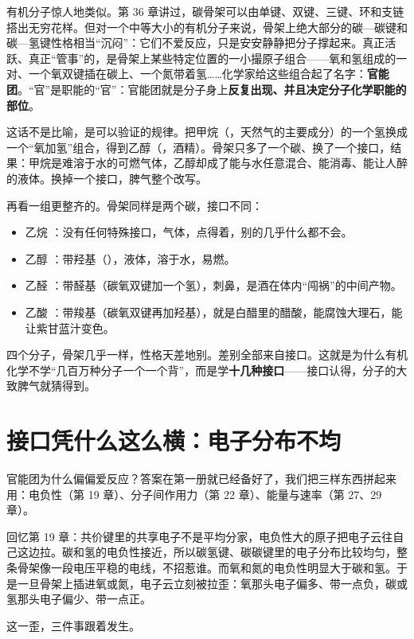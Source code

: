 有机分子惊人地类似。第 36 章讲过，碳骨架可以由单键、双键、三键、环和支链搭出无穷花样。但对一个中等大小的有机分子来说，骨架上绝大部分的碳—碳键和碳—氢键性格相当“沉闷”：它们不爱反应，只是安安静静把分子撑起来。真正活跃、真正“管事”的，是骨架上某些特定位置的一小撮原子组合——氧和氢组成的一对、一个氧双键插在碳上、一个氮带着氢……化学家给这些组合起了名字：\textbf{官能团}。“官”是职能的“官”：官能团就是分子身上\textbf{反复出现、并且决定分子化学职能的部位}。

这话不是比喻，是可以验证的规律。把甲烷（，天然气的主要成分）的一个氢换成一个“氧加氢”组合，得到乙醇（，酒精）。骨架只多了一个碳、换了一个接口，结果：甲烷是难溶于水的可燃气体，乙醇却成了能与水任意混合、能消毒、能让人醉的液体。换掉一个接口，脾气整个改写。

再看一组更整齐的。骨架同样是两个碳，接口不同：

\begin{itemize}[itemsep=2pt]
\item 乙烷 ：没有任何特殊接口，气体，点得着，别的几乎什么都不会。
\item 乙醇 ：带羟基（），液体，溶于水，易燃。
\item 乙醛 ：带醛基（碳氧双键加一个氢），刺鼻，是酒在体内“闯祸”的中间产物。
\item 乙酸 ：带羧基（碳氧双键再加羟基），就是白醋里的醋酸，能腐蚀大理石，能让紫甘蓝汁变色。
\end{itemize}

四个分子，骨架几乎一样，性格天差地别。差别全部来自接口。这就是为什么有机化学不学“几百万种分子一个一个背”，而是学\textbf{十几种接口}——接口认得，分子的大致脾气就猜得到。

\section{接口凭什么这么横：电子分布不均}

官能团为什么偏偏爱反应？答案在第一册就已经备好了，我们把三样东西拼起来用：电负性（第 19 章）、分子间作用力（第 22 章）、能量与速率（第 27、29 章）。

回忆第 19 章：共价键里的共享电子不是平均分家，电负性大的原子把电子云往自己这边拉。碳和氢的电负性接近，所以碳氢键、碳碳键里的电子分布比较均匀，整条骨架像一段电压平稳的电线，不招惹谁。而氧和氮的电负性明显大于碳和氢。于是一旦骨架上插进氧或氮，电子云立刻被拉歪：氧那头电子偏多、带一点负，碳或氢那头电子偏少、带一点正。

这一歪，三件事跟着发生。

